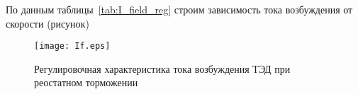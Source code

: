 По данным таблицы~\ref{tab:I_field_reg} строим зависимость тока возбуждения от скорости (рисунок)

\begin{figure}[H]
    \centering    
    \texttt{[image: If.eps]}
    \caption{Регулировочная характеристика тока возбуждения ТЭД при реостатном торможении}
    \label{fig:If}
\end{figure}













